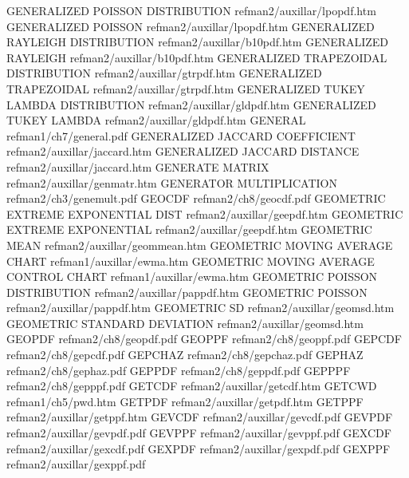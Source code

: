 GENERALIZED POISSON DISTRIBUTION        refman2/auxillar/lpopdf.htm
GENERALIZED POISSON                     refman2/auxillar/lpopdf.htm
GENERALIZED RAYLEIGH DISTRIBUTION       refman2/auxillar/b10pdf.htm
GENERALIZED RAYLEIGH                    refman2/auxillar/b10pdf.htm
GENERALIZED TRAPEZOIDAL DISTRIBUTION    refman2/auxillar/gtrpdf.htm
GENERALIZED TRAPEZOIDAL                 refman2/auxillar/gtrpdf.htm
GENERALIZED TUKEY LAMBDA DISTRIBUTION   refman2/auxillar/gldpdf.htm
GENERALIZED TUKEY LAMBDA                refman2/auxillar/gldpdf.htm
GENERAL                                 refman1/ch7/general.pdf
GENERALIZED JACCARD COEFFICIENT         refman2/auxillar/jaccard.htm
GENERALIZED JACCARD DISTANCE            refman2/auxillar/jaccard.htm
GENERATE MATRIX                         refman2/auxillar/genmatr.htm
GENERATOR MULTIPLICATION                refman2/ch3/genemult.pdf
GEOCDF                                  refman2/ch8/geocdf.pdf
GEOMETRIC EXTREME EXPONENTIAL DIST      refman2/auxillar/geepdf.htm
GEOMETRIC EXTREME EXPONENTIAL           refman2/auxillar/geepdf.htm
GEOMETRIC MEAN                          refman2/auxillar/geommean.htm
GEOMETRIC MOVING AVERAGE CHART          refman1/auxillar/ewma.htm
GEOMETRIC MOVING AVERAGE CONTROL CHART  refman1/auxillar/ewma.htm
GEOMETRIC POISSON DISTRIBUTION          refman2/auxillar/pappdf.htm
GEOMETRIC POISSON                       refman2/auxillar/pappdf.htm
GEOMETRIC SD                            refman2/auxillar/geomsd.htm
GEOMETRIC STANDARD DEVIATION            refman2/auxillar/geomsd.htm
GEOPDF                                  refman2/ch8/geopdf.pdf
GEOPPF                                  refman2/ch8/geoppf.pdf
GEPCDF                                  refman2/ch8/gepcdf.pdf
GEPCHAZ                                 refman2/ch8/gepchaz.pdf
GEPHAZ                                  refman2/ch8/gephaz.pdf
GEPPDF                                  refman2/ch8/geppdf.pdf
GEPPPF                                  refman2/ch8/gepppf.pdf
GETCDF                                  refman2/auxillar/getcdf.htm
GETCWD                                  refman1/ch5/pwd.htm
GETPDF                                  refman2/auxillar/getpdf.htm
GETPPF                                  refman2/auxillar/getppf.htm
GEVCDF                                  refman2/auxillar/gevcdf.pdf
GEVPDF                                  refman2/auxillar/gevpdf.pdf
GEVPPF                                  refman2/auxillar/gevppf.pdf
GEXCDF                                  refman2/auxillar/gexcdf.pdf
GEXPDF                                  refman2/auxillar/gexpdf.pdf
GEXPPF                                  refman2/auxillar/gexppf.pdf
